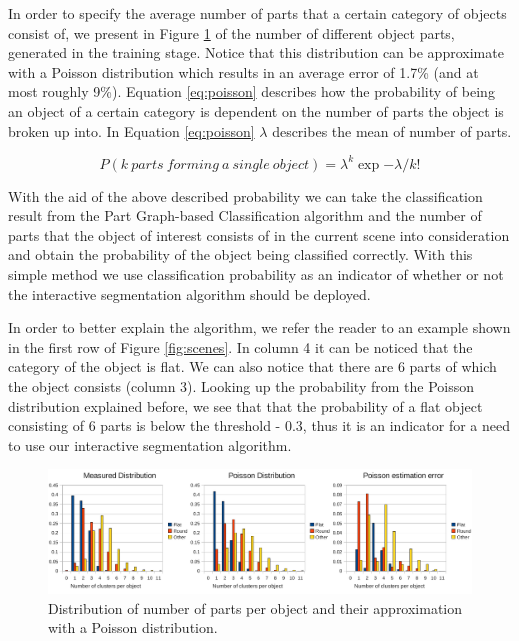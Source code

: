 In order to specify the average number of parts that a certain category of objects consist of, we present in Figure \ref{fig:poisson} of the number of different object parts, generated in the training stage. Notice that this distribution can be approximate with a Poisson distribution which results in an average error of 1.7\% (and at most roughly 9\%). Equation \ref{eq:poisson} describes how the probability of being an object of a certain category is dependent on the number of parts the object is broken up into. 
In Equation \ref{eq:poisson} $\lambda$ describes the mean of number of parts.

\begin{equation}
\label{eq:poisson}
P(k~parts~forming~a~single~object) = \lambda^k \exp{-\lambda} / k!
\end{equation}

With the aid of the above described probability we can take the classification result from the Part Graph-based Classification algorithm and the number of parts that the object of interest consists of in the current scene into consideration and obtain the probability of the object being classified correctly. With this simple method we use classification probability as an indicator of whether or not the interactive segmentation algorithm should be deployed.  

In order to better explain the algorithm, we refer the reader to an example shown in the first row of Figure \ref{fig:scenes}. In column 4 it can be noticed that the category of the object is flat. We can also notice that there are 6 parts of which the object consists (column 3). Looking up the probability from the Poisson distribution explained before, we see that that the probability of a flat object consisting of 6 parts is below the threshold - $0.3$, thus it is an indicator for a need to use our interactive segmentation algorithm.



\begin{figure}[h!]
\centering
  \includegraphics[width=0.98\columnwidth, trim=0ex 0ex 53ex 0ex, clip]{figures/dataset_stats.pdf}
	\vspace{-2ex}
  \caption{Distribution of number of parts per object and their approximation with a Poisson distribution.}
  \label{fig:poisson}
\end{figure}

